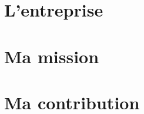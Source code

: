 \documentclass[12pt]{report}
\begin{document}
	

	
	\tableofcontents
	
	\part{L'entreprise}
		
		
	\part{Ma mission}
		
		
	\part{Ma contribution}
		
\end{document}
